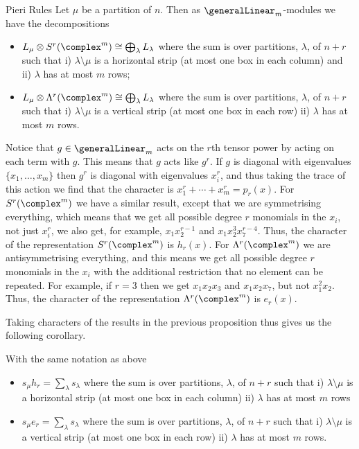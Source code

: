 \begin{prp}{Pieri Rules}{}
    Let \(\mu\) be a partition of \(n\).
    Then as \(\generalLinear_m\)-modules we have the decompositions
    \begin{itemize}
        \item \(L_\mu \otimes S^r(\complex^m) \isomorphic \bigoplus_\lambda L_\lambda\) where the sum is over partitions, \(\lambda\), of \(n + r\) such that i) \(\lambda \setminus \mu\) is a horizontal strip (at most one box in each column) and ii) \(\lambda\) has at most \(m\) rows;
        \item \(L_\mu \otimes \Lambda^r(\complex^m) \isomorphic \bigoplus_\lambda L_\lambda\) where the sum is over partitions, \(\lambda\), of \(n + r\) such that i) \(\lambda \setminus \mu\) is a vertical strip (at most one box in each row) ii) \(\lambda\) has at most \(m\) rows.
    \end{itemize}
\end{prp}

Notice that \(g \in \generalLinear_m\) acts on the \(r\)th tensor power by acting on each term with \(g\).
This means that \(g\) acts like \(g^r\).
If \(g\) is diagonal with eigenvalues \(\{x_1, \dotsc, x_m\}\) then \(g^r\) is diagonal with eigenvalues \(x_i^r\), and thus taking the trace of this action we find that the character is \(x_1^r + \dotsb + x_m^r = p_r(x)\).
For \(S^r(\complex^m)\) we have a similar result, except that we are symmetrising everything, which means that we get all possible degree \(r\) monomials in the \(x_i\), not just \(x_i^r\), we also get, for example, \(x_1x_2^{r-1}\) and \(x_1 x_2^3 x_7^{r-4}\).
Thus, the character of the representation \(S^r(\complex^m)\) is \(h_r(x)\).
For \(\Lambda^r(\complex^m)\) we are antisymmetrising everything, and this means we get all possible degree \(r\) monomials in the \(x_i\) with the additional restriction that no element can be repeated.
For example, if \(r = 3\) then we get \(x_1x_2x_3\) and \(x_1 x_2 x_7\), but not \(x_1^2x_2\).
Thus, the character of the representation \(\Lambda^r(\complex^m)\) is \(e_r(x)\).

Taking characters of the results in the previous proposition thus gives us the following corollary.

\begin{crl}{}{}
    With the same notation as above
    \begin{itemize}
        \item \(s_\mu h_r = \sum_\lambda s_\lambda\) where the sum is over partitions, \(\lambda\), of \(n + r\) such that i) \(\lambda \setminus \mu\) is a horizontal strip (at most one box in each column) ii) \(\lambda\) has at most \(m\) rows
        \item \(s_\mu e_r = \sum_\lambda s_\lambda\) where the sum is over partitions, \(\lambda\), of \(n + r\) such that i) \(\lambda \setminus \mu\) is a vertical strip (at most one box in each row) ii) \(\lambda\) has at most \(m\) rows.
    \end{itemize}
\end{crl}

